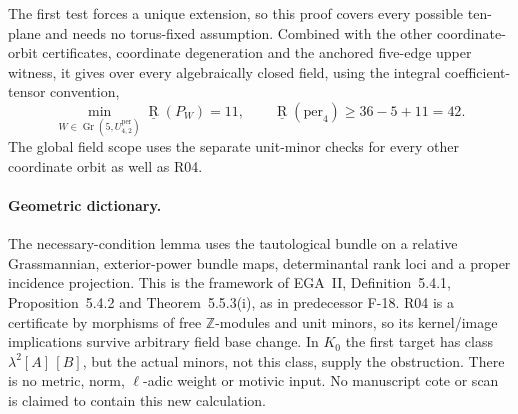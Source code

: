 The first test forces a unique extension, so this proof
covers every possible ten-plane and needs no torus-fixed
assumption. Combined with the other coordinate-orbit
certificates, coordinate degeneration and the anchored
five-edge upper witness, it gives over every algebraically closed field, using the integral coefficient-tensor convention,
\[
 \min_{W\in\operatorname{Gr}(5,U_{4,2}^{\mathrm{per}})}
     \underline{\operatorname R}(P_W)=11,\qquad
 \underline{\operatorname R}(\mathrm{per}_4)\geq36-5+11=42.
\]
The global field scope uses the separate unit-minor checks for every other coordinate orbit as well as R04.

\paragraph{Geometric dictionary.}
The necessary-condition lemma uses the tautological bundle on a relative Grassmannian,
exterior-power bundle maps, determinantal rank loci and a
proper incidence projection. This is the framework of
EGA~II, Definition~5.4.1, Proposition~5.4.2 and
Theorem~5.5.3(i), as in predecessor F-18.
R04 is a certificate by morphisms of free $\mathbb Z$-modules
and unit minors, so its kernel/image implications survive
arbitrary field base change. In $K_0$ the first target has
class $\lambda^2[A]\,[B]$, but the actual minors, not this
class, supply the obstruction. There is no metric, norm,
$\ell$-adic weight or motivic input. No manuscript cote or
scan is claimed to contain this new calculation.
